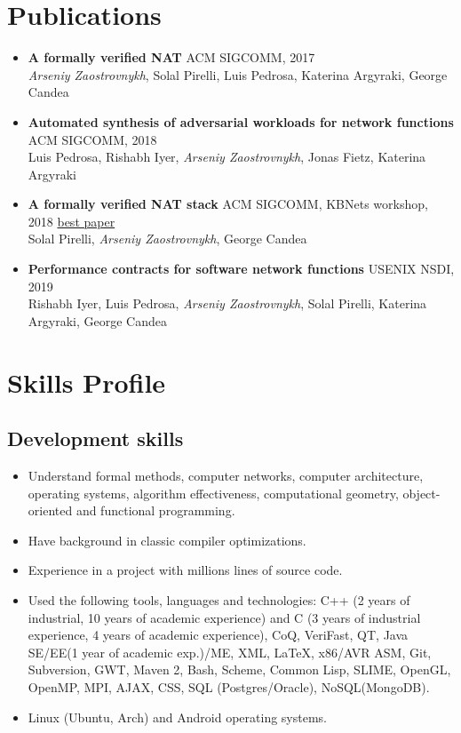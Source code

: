 \documentclass[letterpaper]{resume}
\begin{document}
\section{Publications}

\begin{itemize}
\item \textbf{A formally verified NAT} {ACM SIGCOMM, 2017}\\
  \emph{Arseniy Zaostrovnykh}, Solal Pirelli, Luis Pedrosa, Katerina Argyraki, George Candea
\item \textbf{Automated synthesis of adversarial workloads for network
    functions} {ACM SIGCOMM, 2018}\\
  Luis Pedrosa, Rishabh Iyer, \emph{Arseniy Zaostrovnykh}, Jonas Fietz, Katerina Argyraki
\item \textbf{A formally verified NAT stack} {ACM SIGCOMM, KBNets workshop, 2018}
  \underline{best paper} \\
  Solal Pirelli, \emph{Arseniy Zaostrovnykh}, George Candea

\item \textbf{Performance contracts for software network functions} {USENIX NSDI, 2019} \\
  Rishabh Iyer, Luis Pedrosa, \emph{Arseniy Zaostrovnykh}, Solal Pirelli, Katerina Argyraki, George Candea
\end{itemize}

\section{Skills Profile}
\subsection{Development skills}
\begin{itemize}
    \item Understand formal methods, computer networks, computer architecture, operating systems, algorithm effectiveness, computational geometry, object-oriented and functional programming.
    \item Have background in classic compiler optimizations.
    \item Experience in a project with millions lines of source code.
    \item Used the following tools, languages and technologies: C++ (2 years of
      industrial, 10 years of academic experience) and C (3 years of industrial
      experience, 4 years of academic experience), CoQ, VeriFast, QT, Java SE/EE(1 year of academic exp.)/ME, XML, \LaTeX, x86/AVR ASM, Git, Subversion, GWT, Maven 2, Bash, Scheme, Common Lisp, SLIME, OpenGL, OpenMP, MPI, AJAX, CSS, SQL (Postgres/Oracle), NoSQL(MongoDB).
    \item Linux (Ubuntu, Arch) and Android operating systems.
\end{itemize}
\end{document}
